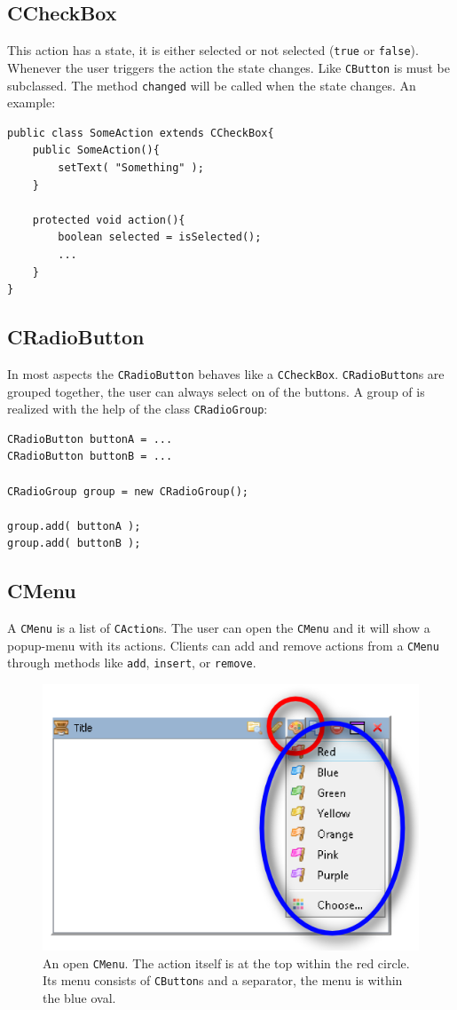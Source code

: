 \documentclass[a4paper,10pt]{article}
\newcommand{\src}[1]{\texttt{#1}}
\begin{document}
\subsection{CCheckBox}
This action has a state, it is either selected or not selected (\src{true} or \src{false}). Whenever the user triggers the action the state changes. Like \src{CButton} is must be subclassed. The method \src{changed} will be called when the state changes. An example:
\begin{lstlisting}
public class SomeAction extends CCheckBox{
	public SomeAction(){
		setText( "Something" );
	}
	
	protected void action(){
		boolean selected = isSelected();
		...
	}
}
\end{lstlisting}

\subsection{CRadioButton}
In most aspects the \src{CRadioButton} behaves like a \src{CCheckBox}. \src{CRadioButton}s are grouped together, the user can always select on of the buttons. A group of is realized with the help of the class \src{CRadioGroup}:
\begin{lstlisting}
CRadioButton buttonA = ...
CRadioButton buttonB = ...

CRadioGroup group = new CRadioGroup();

group.add( buttonA );
group.add( buttonB );
\end{lstlisting}

\subsection{CMenu}
A \src{CMenu} is a list of \src{CAction}s. The user can open the \src{CMenu} and it will show a popup-menu with its actions. Clients can add and remove actions from a \src{CMenu} through methods like \src{add}, \src{insert}, or \src{remove}.

\begin{figure}[ht]
\centering
\includegraphics[scale=1]{cmenu}
\caption{An open \src{CMenu}. The action itself is at the top within the red circle. Its menu consists of \src{CButton}s and a separator, the menu is within the blue oval.}
\label{fig:cmenu}
\end{figure}
\end{document}
